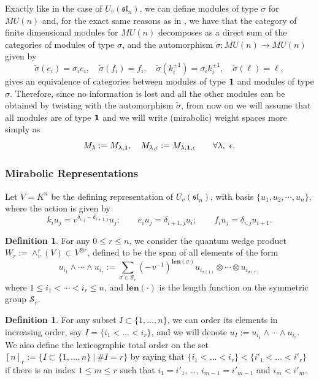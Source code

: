 \documentclass{amsart}
\numberwithin{equation}{section}
\theoremstyle{theorem}
\theoremstyle{definition}
\newtheorem{definition}[theorem]{Definition}
\newcommand{\sll}{\mathfrak{sl}}
\newcommand{\len}{\mathbf{len}}
\newcommand{\uvsln}{U_v(\sll_n)}
\begin{document}
Exactly like in the case of $\uvsln$, we can define modules of type $\sigma$ for $MU(n)$ and, for the exact same reasons as in \cite[\S 5.2]{J}, we have that the category of finite dimensional modules for $MU(n)$ decomposes as a direct sum of the categories of modules of type $\sigma$, and the automorphism $\widetilde{\sigma}:MU(n)\to MU(n)$ given by
$$\widetilde{\sigma}(e_i)=\sigma_ie_i,\quad \widetilde{\sigma}(f_i)=f_i,\quad\widetilde{\sigma}(k_i^{\pm 1})=\sigma_ik_i^{\pm 1},\quad\widetilde{\sigma}(\ell)=\ell,$$
gives an equivalence of categories between modules of type $\bold{1}$ and modules of type $\sigma$. Therefore, since no information is lost and all the other modules can be obtained by twisting with the automorphism $\widetilde{\sigma}$, from now on we will assume that all modules are of type $\bold{1}$ and we will write (mirabolic) weight spaces more simply as
$$M_{\lambda}:=M_{\lambda,\bold{1}},\quad M_{\lambda,\epsilon}:=M_{\lambda,\bold{1},\epsilon}\qquad\forall \lambda,~\epsilon.$$
\subsubsection{Mirabolic Representations}\label{sec:mir-reps}
Let $V=K^n$ be the defining representation of $\uvsln$, with basis $\{u_1, u_2, \cdots, u_n\}$, 
where the action is given by
\[k_iu_j=v^{\delta_{i,j}-\delta_{i+1,j}}u_j;\qquad e_iu_j=\delta_{i+1,j}u_i;\qquad f_iu_j=\delta_{i,j}u_{i+1}.\]
\begin{definition}For any $0\leq r\leq n$, we consider the quantum wedge product $W_r:=\wedge_v^r(V)\subset V^{\otimes r}$, defined to be the span of all elements of the form
\[u_{i_1}\wedge\cdots\wedge u_{i_r}:=\sum_{\sigma\in \mathcal S_r}(-v^{-1})^{\len(\sigma)}u_{i_{\sigma(1)}}\otimes\cdots\otimes u_{i_{\sigma(r)}}\]
where $1\leq i_1<\cdots<i_r\leq n$, and $\len(\cdot)$ is the length function on the symmetric group $\mathcal S_r$.\end{definition}
\begin{definition}\label{def:lexi}
For any subset $I\subset\{1,\ldots,n\}$, we can order its elements in increasing order, say $I=\{i_1<\ldots<i_r\}$, and we will denote $u_I:=u_{i_1}\wedge\cdots\wedge u_{i_r}$. We also define the lexicographic total order on the set $[n]_r:=\{I\subset\{1,\ldots,n\}~|~\#I=r\}$ by saying that $\{i_1<\ldots<i_r\}< \{i'_1<\ldots< i'_r\}$ if there is an index $1\leq m\leq r$ such that $i_1=i'_1$, \ldots, $i_{m-1}=i'_{m-1}$ and $i_{m}<i'_m$.\end{definition}
\end{document}
